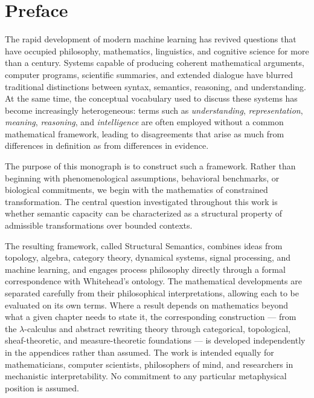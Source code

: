 \documentclass[11pt,twoside,openright]{book}
\numberwithin{equation}{chapter}
\theoremstyle{definition}
\theoremstyle{plain}
\theoremstyle{remark}
\theoremstyle{definition}
\begin{document}
\tableofcontents
\cleardoublepage

\chapter*{Preface}

The rapid development of modern machine learning has revived questions
that have occupied philosophy, mathematics, linguistics, and cognitive
science for more than a century. Systems capable of producing coherent
mathematical arguments, computer programs, scientific summaries, and
extended dialogue have blurred traditional distinctions between syntax,
semantics, reasoning, and understanding. At the same time, the conceptual
vocabulary used to discuss these systems has become increasingly
heterogeneous: terms such as \emph{understanding}, \emph{representation},
\emph{meaning}, \emph{reasoning}, and \emph{intelligence} are often
employed without a common mathematical framework, leading to disagreements
that arise as much from differences in definition as from differences in
evidence.

The purpose of this monograph is to construct such a framework. Rather
than beginning with phenomenological assumptions, behavioral benchmarks,
or biological commitments, we begin with the mathematics of constrained
transformation. The central question investigated throughout this work is
whether semantic capacity can be characterized as a structural property of
admissible transformations over bounded contexts.

The resulting framework, called Structural Semantics, combines ideas from
topology, algebra, category theory, dynamical systems, signal processing,
and machine learning, and engages process philosophy directly through a
formal correspondence with Whitehead's ontology. The mathematical
developments are separated carefully from their philosophical
interpretations, allowing each to be evaluated on its own terms. Where a
result depends on mathematics beyond what a given chapter needs to state
it, the corresponding construction --- from the $\lambda$-calculus and
abstract rewriting theory through categorical, topological,
sheaf-theoretic, and measure-theoretic foundations --- is developed
independently in the appendices rather than assumed. The work is intended
equally for mathematicians, computer scientists, philosophers of mind,
and researchers in mechanistic interpretability. No commitment to any
particular metaphysical position is assumed.
\end{document}
